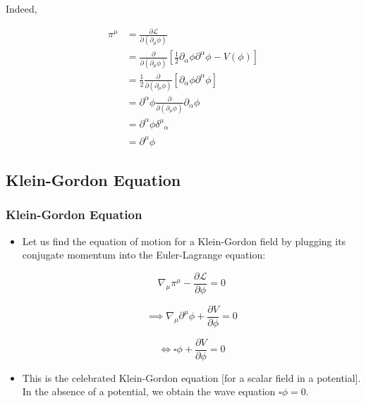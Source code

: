\documentclass{beamer}
\begin{document}
\begin{frame}
Indeed,

\begin{align*}
\pi^\mu & = \frac{\partial \mathcal{L}}{\partial \left( \partial_\mu \phi \right)} \\
& = \frac{\partial}{\partial \left( \partial_\mu \phi \right)} \left[ \frac{1}{2} \partial_\alpha \phi \partial^\alpha \phi - V \left( \phi \right) \right] \\
& = \frac{1}{2} \frac{\partial}{\partial \left( \partial_\mu \phi \right)} \left[ \partial_\alpha \phi \partial^\alpha \phi \right] \\
& = \partial^\alpha \phi \frac{\partial}{\partial \left( \partial_\mu \phi \right)} \partial_\alpha \phi \\
& = \partial^\alpha \phi \delta^\mu_{\phantom{\mu} \alpha} \\
& = \partial^\mu \phi
\end{align*}
\end{frame}

\subsection{Klein-Gordon Equation}

\begin{frame}
\frametitle{Klein-Gordon Equation}

\begin{itemize}
\item Let us find the equation of motion for a Klein-Gordon field by plugging its conjugate momentum into the Euler-Lagrange equation:

$$\nabla_\mu \pi^\mu - \frac{\partial \mathcal{L}}{\partial \phi} = 0$$

$$\implies \boxed{\nabla_\mu \partial^\mu \phi + \frac{\partial V}{\partial \phi} = 0}$$

$$\Longleftrightarrow \square \phi + \frac{\partial V}{\partial \phi} = 0$$

\item This is the celebrated Klein-Gordon equation [for a scalar field in a potential]. In the absence of a potential, we obtain the wave equation $\square \phi = 0$.
\end{itemize}
\end{frame}
\end{document}
